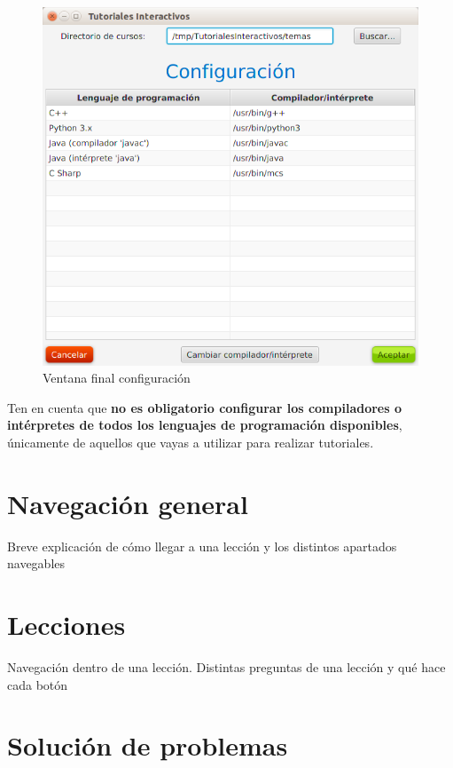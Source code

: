 \documentclass[]{article}
\begin{document}
%
\begin{figure}[tbp]
\begin{center}
\includegraphics[scale=0.4]{Configuracion_lenguajes_relleno.png}
\end{center}
\caption{Ventana final configuración\label{fig:config3}}
\end{figure}
%
Ten en cuenta que \textbf{no es obligatorio configurar los compiladores o intérpretes de todos los lenguajes de programación disponibles}, únicamente de aquellos que vayas a utilizar para realizar tutoriales.


\section{Navegación general}
Breve explicación de cómo llegar a una lección y los distintos apartados navegables

\section{Lecciones}
Navegación dentro de una lección. Distintas preguntas de una lección y qué hace cada botón

\section{Solución de problemas}
\end{document}
